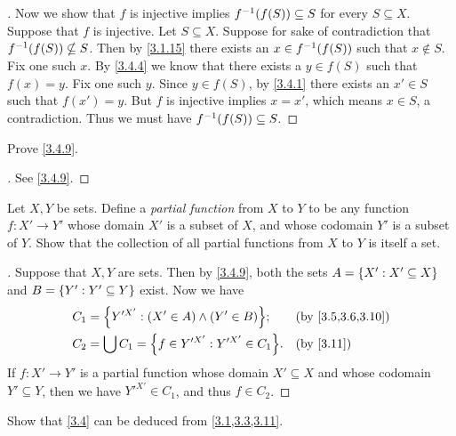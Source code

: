 \begin{proof}[]
  Now we show that \(f\) is injective implies \(f^{-1}\pa{f(S)} \subseteq S\) for every \(S \subseteq X\).
  Suppose that \(f\) is injective.
  Let \(S \subseteq X\).
  Suppose for sake of contradiction that \(f^{-1}\pa{f(S)} \nsubseteq S\).
  Then by \cref{3.1.15} there exists an \(x \in f^{-1}\pa{f(S)}\) such that \(x \notin S\).
  Fix one such \(x\).
  By \cref{3.4.4} we know that there exists a \(y \in f(S)\) such that \(f(x) = y\).
  Fix one such \(y\).
  Since \(y \in f(S)\), by \cref{3.4.1} there exists an \(x' \in S\) such that \(f(x') = y\).
  But \(f\) is injective implies \(x = x'\), which means \(x \in S\), a contradiction.
  Thus we must have \(f^{-1}\pa{f(S)} \subseteq S\).
\end{proof}

\begin{ex}\label{ex:3.4.6}
  Prove \cref{3.4.9}.
\end{ex}

\begin{proof}[]
  See \cref{3.4.9}.
\end{proof}

\begin{ex}\label{ex:3.4.7}
  Let \(X, Y\) be sets.
  Define a \emph{partial function} from \(X\) to \(Y\) to be any function \(f : X' \to Y'\) whose domain \(X'\) is a subset of \(X\), and whose codomain \(Y'\) is a subset of \(Y\).
  Show that the collection of all partial functions from \(X\) to \(Y\) is itself a set.
\end{ex}

\begin{proof}[]
  Suppose that \(X, Y\) are sets.
  Then by \cref{3.4.9}, both the sets \(A = \left\lbrace X' : X' \subseteq X\right\rbrace\) and \(B = \left\lbrace Y' : Y' \subseteq Y\right\rbrace\) exist.
  Now we have
  \begin{align*}
    C_1 & = \set{Y'^{X'} : \pa{X' \in A} \land \pa{Y' \in B}};   &  & \by{3.5,3.6,3.10} \\
    C_2 & = \bigcup C_1 = \set{f \in Y'^{X'} : Y'^{X'} \in C_1}. &  & \by{3.11}         \\
  \end{align*}
  If \(f : X' \to Y'\) is a partial function whose domain \(X' \subseteq X\) and whose codomain \(Y' \subseteq Y\), then we have \(Y'^{X'} \in C_1\), and thus \(f \in C_2\).
\end{proof}

\begin{ex}\label{ex:3.4.8}
  Show that \cref{3.4} can be deduced from \cref{3.1,3.3,3.11}.
\end{ex}

